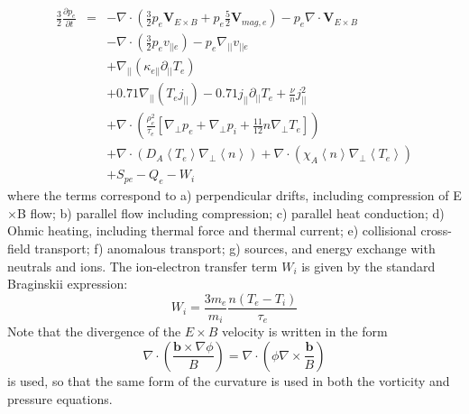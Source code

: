 \documentclass[12pt,a4paper]{article}
\newcommand{\deriv}[2]{\frac{\partial #1}{\partial #2}}
\begin{document}
\begin{subequations}
\begin{eqnarray}
  \frac{3}{2}\deriv{p_e}{t} &=& -\nabla\cdot\left(\frac{3}{2}p_e\mathbf{V}_{E\times B} + p_e\frac{5}{2}\mathbf{V}_{mag,e}\right) - p_e\nabla\cdot\mathbf{V}_{E\times B}\\
  &&  - \nabla\cdot\left(\frac{3}{2}p_e v_{||e}\right) - p_e\nabla_{||}v_{||e} \\
  && + \nabla_{||}\left(\kappa_{e||}\partial_{||}T_e\right)  \\
  && + 0.71\nabla_{||}\left(T_e j_{||}\right) - 0.71 j_{||}\partial_{||} T_e + \frac{\nu}{n}j_{||}^2 \\
  && + \nabla\cdot\left(\frac{\rho_e^2}{\tau_e}\left[\nabla_\perp p_e + \nabla_\perp p_i + \frac{11}{12}n\nabla_\perp T_e\right]\right) \\
  && + \nabla\cdot \left(D_A\left<T_e\right>\nabla_\perp \left<n\right>\right) + \nabla\cdot\left(\chi_A \left<n\right>\nabla_\perp \left<T_e\right>\right) \\
  && + S_{pe} - Q_e - W_i
\end{eqnarray}
\end{subequations}
where the terms correspond to a) perpendicular drifts, including compression of E$\times$B flow; b) parallel flow including compression; c) parallel heat conduction; d) Ohmic heating, including thermal force and thermal current; e) collisional cross-field transport; f) anomalous transport; g) sources, and energy exchange with neutrals and ions.
The ion-electron transfer term $W_i$ is given by the standard Braginskii expression:
\begin{equation}
  W_i = \frac{3m_e}{m_i}\frac{n\left(T_e - T_i\right)}{\tau_e}
\end{equation}
Note that the divergence of the $E\times B$ velocity is written in the form
\[
\nabla\cdot\left(\frac{\mathbf{b}\times\nabla\phi}{B}\right) = \nabla\cdot\left( \phi \nabla\times\frac{\mathbf{b}}{B}\right)
\]
is used, so that the same form of the curvature is used in both the vorticity and pressure equations.
\end{document}
